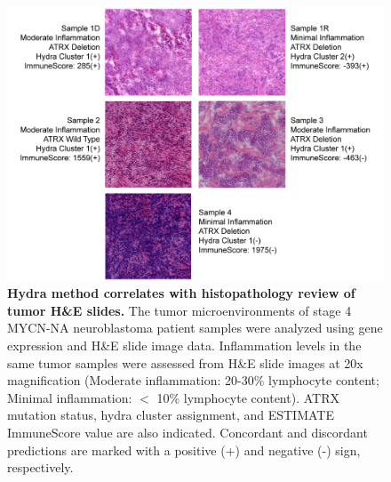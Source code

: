 \documentclass[10pt,letterpaper]{article}
\begin{document}
\begin{figure}[!h]
	\includegraphics[width=\textwidth]{img/PNG/NBL-MYCN-NA-HE-2x}
	\caption{{\bf Hydra method correlates with histopathology review of tumor H\&E slides.}
		The tumor microenvironments of stage 4 MYCN-NA neuroblastoma patient samples were analyzed using gene expression and H\&E slide image data. Inflammation levels in the same tumor samples were assessed from H\&E slide images at 20x magnification (Moderate inflammation: 20-30\% lymphocyte content; Minimal inflammation: $<$ 10\% lymphocyte content). ATRX mutation status, hydra cluster assignment, and ESTIMATE ImmuneScore value are also indicated. Concordant and discordant predictions are marked with a positive (+) and negative (-) sign, respectively.}
	\label{hefig}
\end{figure}
\end{document}
